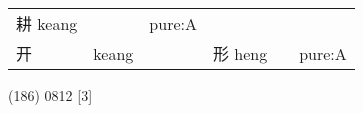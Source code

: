 \documentclass[14pt,a4paper]{scrartcl}
\begin{document}
\begin{longtable}[c]{@{}llllll@{}}
\begin{minipage}[t]{0.14\columnwidth}
耕 keang
\strut\end{minipage} &
\begin{minipage}[t]{0.14\columnwidth}\raggedright\strut
\strut\end{minipage} &
\begin{minipage}[t]{0.14\columnwidth}\raggedright\strut
pure:A
\strut\end{minipage}\tabularnewline
\begin{minipage}[t]{0.14\columnwidth}\raggedright\strut
开
\strut\end{minipage} &
\begin{minipage}[t]{0.14\columnwidth}\raggedright\strut
keang
\strut\end{minipage} &
\begin{minipage}[t]{0.14\columnwidth}\raggedright\strut
\strut\end{minipage} &
\begin{minipage}[t]{0.14\columnwidth}\raggedright\strut
形 heng
\strut\end{minipage} &
\begin{minipage}[t]{0.14\columnwidth}\raggedright\strut
\strut\end{minipage} &
\begin{minipage}[t]{0.14\columnwidth}\raggedright\strut
pure:A
\strut\end{minipage}\tabularnewline
\bottomrule
\end{longtable}

(186) 0812 {[}3{]}
\end{document}
